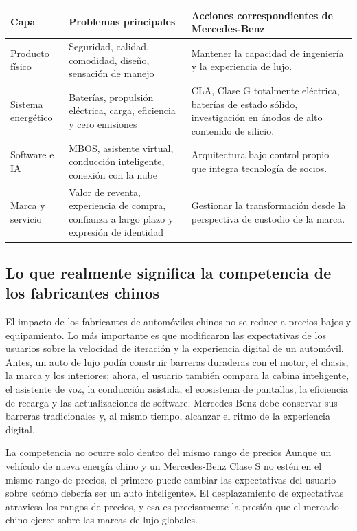 \noindent\begin{tabularx}{\textwidth}{p{}p{}X}
\toprule
Capa & Problemas principales & Acciones correspondientes de Mercedes-Benz \\
\midrule
Producto físico & Seguridad, calidad, comodidad, diseño, sensación de manejo & Mantener la capacidad de ingeniería y la experiencia de lujo. \\
Sistema energético & Baterías, propulsión eléctrica, carga, eficiencia y cero emisiones & CLA, Clase G totalmente eléctrica, baterías de estado sólido, investigación en ánodos de alto contenido de silicio. \\
Software e IA & MBOS, asistente virtual, conducción inteligente, conexión con la nube & Arquitectura bajo control propio que integra tecnología de socios. \\
Marca y servicio & Valor de reventa, experiencia de compra, confianza a largo plazo y expresión de identidad & Gestionar la transformación desde la perspectiva de custodio de la marca. \\
\bottomrule
\end{tabularx}

\subsection{Lo que realmente significa la competencia de los fabricantes chinos}

El impacto de los fabricantes de automóviles chinos no se reduce a precios bajos y equipamiento. Lo más importante es que modificaron las expectativas de los usuarios sobre la velocidad de iteración y la experiencia digital de un automóvil. Antes, un auto de lujo podía construir barreras duraderas con el motor, el chasis, la marca y los interiores; ahora, el usuario también compara la cabina inteligente, el asistente de voz, la conducción asistida, el ecosistema de pantallas, la eficiencia de recarga y las actualizaciones de software. Mercedes-Benz debe conservar sus barreras tradicionales y, al mismo tiempo, alcanzar el ritmo de la experiencia digital.

\begin{warningbox}{La competencia no ocurre solo dentro del mismo rango de precios}
Aunque un vehículo de nueva energía chino y un Mercedes-Benz Clase S no estén en el mismo rango de precios, el primero puede cambiar las expectativas del usuario sobre «cómo debería ser un auto inteligente». El desplazamiento de expectativas atraviesa los rangos de precios, y esa es precisamente la presión que el mercado chino ejerce sobre las marcas de lujo globales.
\end{warningbox}

